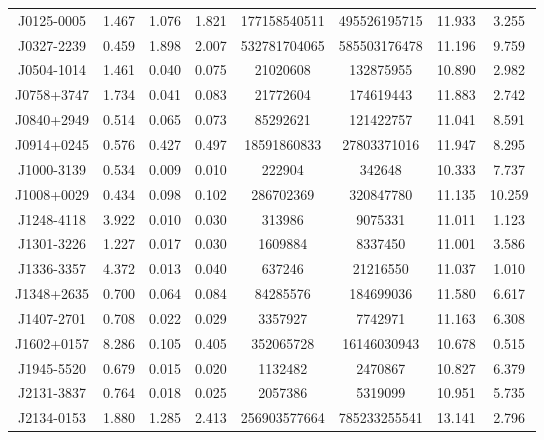 \begin{xltabular}{\textwidth}{cccccccc}
     J0125-0005  & 1.467 & 1.076 & 1.821  & 177158540511 & 495526195715  & 11.933 & 3.255  \\*
     J0327-2239  & 0.459 & 1.898 & 2.007  & 532781704065 & 585503176478  & 11.196 & 9.759 \\*
     J0504-1014 & 1.461 & 0.040 & 0.075  & 21020608 & 132875955  & 10.890 & 2.982\\*
     J0758+3747& 1.734 & 0.041 & 0.083  & 21772604 & 174619443  & 11.883 & 2.742 \\*
     J0840+2949 & 0.514 & 0.065 & 0.073  & 85292621 & 121422757  & 11.041 & 8.591 \\*
      J0914+0245 & 0.576 & 0.427 & 0.497  & 18591860833 & 27803371016  & 11.947 & 8.295  \\*
      J1000-3139 & 0.534 & 0.009 & 0.010  & 222904 & 342648  & 10.333 & 7.737 \\*
      J1008+0029 & 0.434 & 0.098 & 0.102  & 286702369 & 320847780  & 11.135 & 10.259 \\*
      J1248-4118 & 3.922 & 0.010 & 0.030  & 313986 & 9075331  & 11.011 & 1.123  \\*
      J1301-3226 & 1.227 & 0.017 & 0.030  & 1609884 & 8337450  & 11.001 & 3.586 \\*
      J1336-3357 & 4.372 & 0.013 & 0.040  & 637246 & 21216550  & 11.037 & 1.010  \\*
      J1348+2635 & 0.700 & 0.064 & 0.084  & 84285576 & 184699036  & 11.580 & 6.617  \\*
      J1407-2701 & 0.708 & 0.022 & 0.029  & 3357927 & 7742971  & 11.163 & 6.308 \\*
      J1602+0157 & 8.286 & 0.105 & 0.405  & 352065728 & 16146030943  & 10.678 & 0.515  \\*
     J1945-5520 & 0.679 & 0.015 & 0.020  & 1132482 & 2470867  & 10.827 & 6.379  \\*
      J2131-3837 & 0.764 & 0.018 & 0.025  & 2057386 & 5319099  & 10.951 & 5.735  \\*
      J2134-0153 & 1.880 & 1.285 & 2.413  & 256903577664 & 785233255541  & 13.141 & 2.796 \\*

\end{xltabular}
